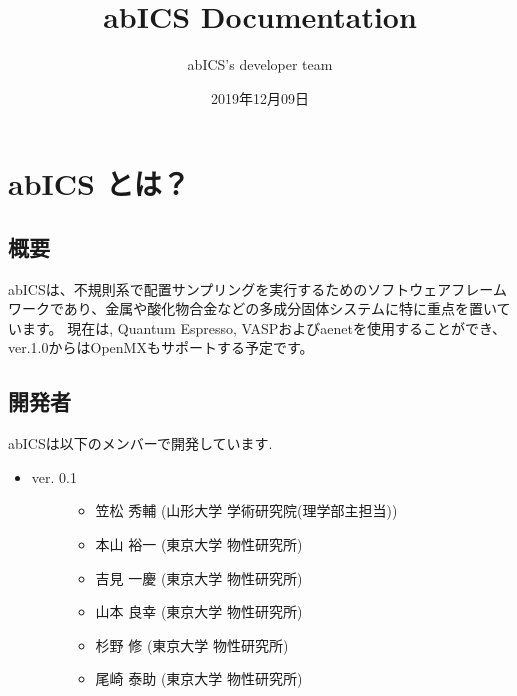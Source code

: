 \documentclass[letterpaper,10pt,dvipdfmx]{sphinxmanual}
\title{abICS Documentation}
\date{2019年12月09日}
\author{abICS's developer team}
\begin{document}
\maketitle
\sphinxtableofcontents
{}\label{\detokenize{index::doc}}



\chapter{abICS とは？}
\label{\detokenize{about/index:abics}}\label{\detokenize{about/index::doc}}

\section{概要}
\label{\detokenize{about/info::doc}}\label{\detokenize{about/info:id1}}
abICSは、不規則系で配置サンプリングを実行するためのソフトウェアフレームワークであり、金属や酸化物合金などの多成分固体システムに特に重点を置いています。
現在は, Quantum Espresso, VASPおよびaenetを使用することができ、ver.1.0からはOpenMXもサポートする予定です。


\section{開発者}
\label{\detokenize{about/info:id2}}
abICSは以下のメンバーで開発しています.
\begin{itemize}
\item {} \begin{description}
\item[{ver. 0.1}] \leavevmode\begin{itemize}
\item {} 
笠松 秀輔 (山形大学 学術研究院(理学部主担当))

\item {} 
本山 裕一 (東京大学 物性研究所)

\item {} 
吉見 一慶 (東京大学 物性研究所)

\item {} 
山本 良幸 (東京大学 物性研究所)

\item {} 
杉野 修 (東京大学 物性研究所)

\item {} 
尾崎 泰助 (東京大学 物性研究所)

\end{itemize}

\end{description}

\end{itemize}
\end{document}

